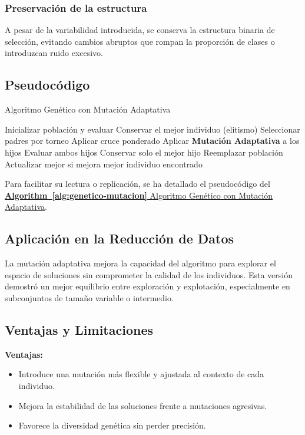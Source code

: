 \subsubsection{Preservación de la estructura}
A pesar de la variabilidad introducida, se conserva la estructura binaria de selección,
evitando cambios abruptos que rompan la proporción de clases o introduzcan ruido excesivo.

\subsection{Pseudocódigo}
\begin{algorithm}[htp]
      \caption{Algoritmo Genético con Mutación Adaptativa}
      \label{alg:genetico-mutacion}
      \begin{algorithmic}[1]
            \State Inicializar población y evaluar
            \State Conservar el mejor individuo (elitismo)
            \State Seleccionar padres por torneo
            \State Aplicar cruce ponderado
            \State Aplicar \textbf{Mutación Adaptativa} a los hijos
            \State Evaluar ambos hijos
            \State Conservar solo el mejor hijo
            \EndWhile
            \State Reemplazar población
            \State Actualizar mejor si mejora
            \EndWhile
            \State \Return mejor individuo encontrado
      \end{algorithmic}
\end{algorithm}

Para facilitar su lectura o replicación, se ha detallado el pseudocódigo del \hyperref[alg:genetico-mutacion]{\textbf{Algorithm~\ref*{alg:genetico-mutacion}} Algoritmo Genético con Mutación Adaptativa}.

\subsection{Aplicación en la Reducción de Datos}
La mutación adaptativa mejora la capacidad del algoritmo para explorar el espacio de soluciones sin comprometer la calidad de los individuos.
Esta versión demostró un mejor equilibrio entre exploración y explotación, especialmente en subconjuntos de tamaño variable o intermedio.

\subsection{Ventajas y Limitaciones}
\textbf{Ventajas:}
\begin{itemize}
      \item Introduce una mutación más flexible y ajustada al contexto de cada individuo.
      \item Mejora la estabilidad de las soluciones frente a mutaciones agresivas.
      \item Favorece la diversidad genética sin perder precisión.
\end{itemize}

